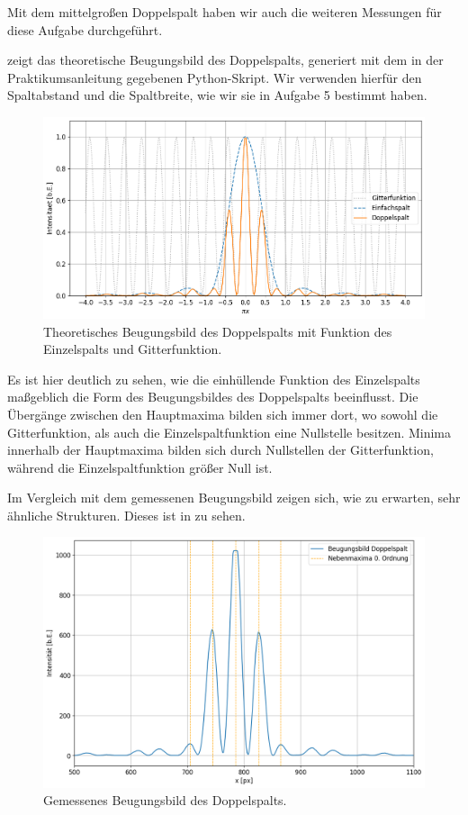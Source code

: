 Mit dem mittelgroßen Doppelspalt haben wir auch die weiteren Messungen für diese Aufgabe durchgeführt.

 zeigt das theoretische Beugungsbild des Doppelspalts, generiert mit dem in der Praktikumsanleitung gegebenen Python-Skript. Wir verwenden hierfür den Spaltabstand und die Spaltbreite, wie wir sie in Aufgabe 5 bestimmt haben.

\begin{figure}[H]
  \centering
  \includegraphics[width=.9\textwidth]{files/plots/3/ds_theorie_beugungsbild.png}
  \caption{Theoretisches Beugungsbild des Doppelspalts mit Funktion des Einzelspalts und Gitterfunktion.}
  \label{fig:ds_theorie_beugungsbild}
\end{figure}

Es ist hier deutlich zu sehen, wie die einhüllende Funktion des Einzelspalts maßgeblich die Form des Beugungsbildes des Doppelspalts beeinflusst. Die Übergänge zwischen den Hauptmaxima bilden sich immer dort, wo sowohl die Gitterfunktion, als auch die Einzelspaltfunktion eine Nullstelle besitzen. Minima innerhalb der Hauptmaxima bilden sich durch Nullstellen der Gitterfunktion, während die Einzelspaltfunktion größer Null ist.

Im Vergleich mit dem gemessenen Beugungsbild zeigen sich, wie zu erwarten, sehr ähnliche Strukturen. Dieses ist in  zu sehen.

\begin{figure}[H]
  \centering
  \includegraphics[width=.9\textwidth]{files/plots/3/ds_gemessen_beugungsbild.png}
  \caption{Gemessenes Beugungsbild des Doppelspalts.}
  \label{fig:ds_gemessen_beugungsbild}
\end{figure}

